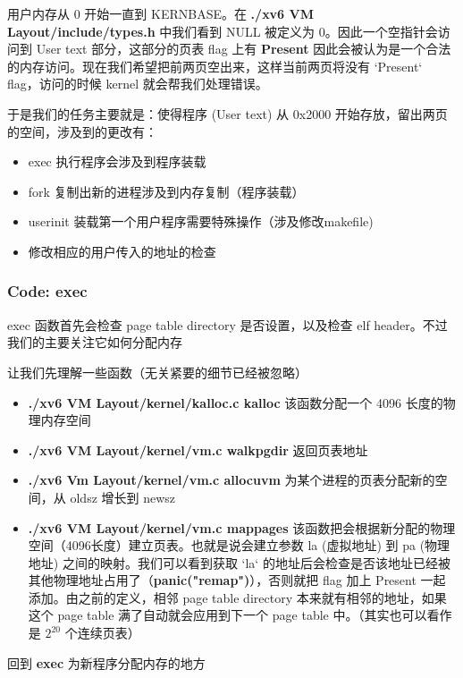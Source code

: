 用户内存从 0 开始一直到 KERNBASE。在 \textbf{./xv6 VM Layout/include/types.h} 中我们看到 NULL 被定义为 0。因此一个空指针会访问到 User text 部分，这部分的页表 flag 上有 \textbf{Present} 因此会被认为是一个合法的内存访问。现在我们希望把前两页空出来，这样当前两页将没有 `Present` flag，访问的时候 kernel 就会帮我们处理错误。

于是我们的任务主要就是：使得程序 (User text) 从 0x2000 开始存放，留出两页的空间，涉及到的更改有：

\begin{itemize}
    \item exec 执行程序会涉及到程序装载
    \item fork 复制出新的进程涉及到内存复制（程序装载）
    \item userinit 装载第一个用户程序需要特殊操作（涉及修改makefile)
    \item 修改相应的用户传入的地址的检查
\end{itemize}


\subsubsection{Code: exec}

exec 函数首先会检查 page table directory 是否设置，以及检查 elf header。不过我们的主要关注它如何分配内存

让我们先理解一些函数（无关紧要的细节已经被忽略）

\begin{itemize}
    \item \textbf{./xv6 VM Layout/kernel/kalloc.c kalloc} 该函数分配一个 4096 长度的物理内存空间
    \item \textbf{./xv6 VM Layout/kernel/vm.c walkpgdir} 返回页表地址
    \item \textbf{./xv6 Vm Layout/kernel/vm.c allocuvm} 为某个进程的页表分配新的空间，从 oldsz 增长到 newsz
    \item \textbf{./xv6 VM Layout/kernel/vm.c mappages} 该函数把会根据新分配的物理空间（4096长度）建立页表。也就是说会建立参数 la (虚拟地址) 到 pa (物理地址) 之间的映射。我们可以看到获取 `la` 的地址后会检查是否该地址已经被其他物理地址占用了（\textbf{panic("remap")}），否则就把 flag 加上 Present 一起添加。由之前的定义，相邻 page table directory 本来就有相邻的地址，如果这个 page table 满了自动就会应用到下一个 page table 中。（其实也可以看作是 $2^{20}$ 个连续页表）
\end{itemize}

回到 \textbf{exec} 为新程序分配内存的地方

